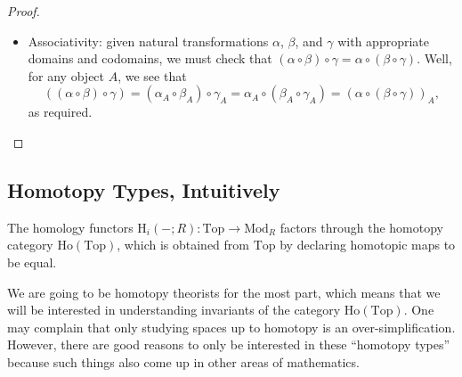 \documentclass[../notes.tex]{subfiles}
\begin{document}
\begin{proof}
\begin{itemize}
		\item Associativity: given natural transformations $\alpha$, $\beta$, and $\gamma$ with appropriate domains and codomains, we must check that $(\alpha\circ\beta)\circ\gamma=\alpha\circ(\beta\circ\gamma)$. Well, for any object $A$, we see that
		\[((\alpha\circ\beta)\circ\gamma)=(\alpha_A\circ\beta_A)\circ\gamma_A=\alpha_A\circ(\beta_A\circ\gamma_A)=(\alpha\circ(\beta\circ\gamma))_A,\]
		as required.
		\qedhere
	\end{itemize}
\end{proof}

\subsection{Homotopy Types, Intuitively}
The homology functors $\mathrm H_i(-;R)\colon\mathrm{Top}\to\mathrm{Mod}_R$ factors through the homotopy category $\mathrm{Ho}(\mathrm{Top})$, which is obtained from $\mathrm{Top}$ by declaring homotopic maps to be equal.

We are going to be homotopy theorists for the most part, which means that we will be interested in understanding invariants of the category $\mathrm{Ho}(\mathrm{Top})$. One may complain that only studying spaces up to homotopy is an over-simplification. However, there are good reasons to only be interested in these ``homotopy types'' because such things also come up in other areas of mathematics.
\end{document}
